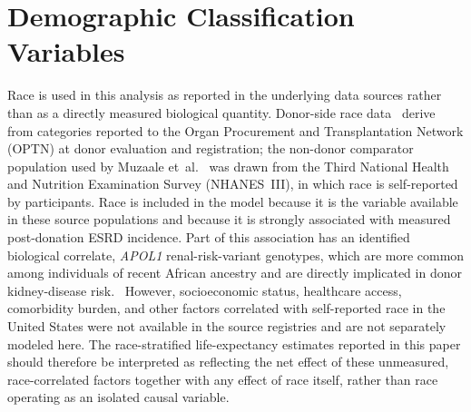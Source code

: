 \section*{Demographic Classification Variables}
\label{sec:demographics}
Race is used in this analysis as reported in the underlying data sources rather than as a directly measured biological quantity. Donor-side race data~\cite{muzaale_risk_2014,massie_quantifying_2017,srtr_2023,usrds_2024,usrds_2025} derive from categories reported to the Organ Procurement and Transplantation Network (OPTN) at donor evaluation and registration; the non-donor comparator population used by Muzaale et~al.~\cite{muzaale_risk_2014} was drawn from the Third National Health and Nutrition Examination Survey (NHANES~III), in which race is self-reported by participants. Race is included in the model because it is the variable available in these source populations and because it is strongly associated with measured post-donation ESRD incidence. Part of this association has an identified biological correlate, \textit{APOL1} renal-risk-variant genotypes, which are more common among individuals of recent African ancestry and are directly implicated in donor kidney-disease risk.~\cite{blackfolks} However, socioeconomic status, healthcare access, comorbidity burden, and other factors correlated with self-reported race in the United States were not available in the source registries and are not separately modeled here. The race-stratified life-expectancy estimates reported in this paper should therefore be interpreted as reflecting the net effect of these unmeasured, race-correlated factors together with any effect of race itself, rather than race operating as an isolated causal variable.
